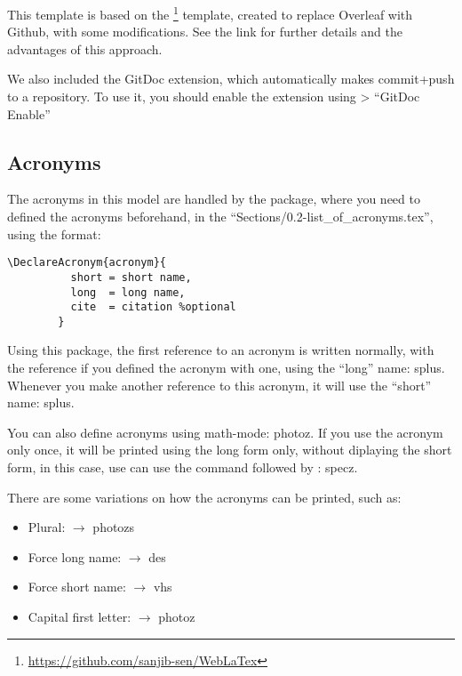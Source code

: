     This template is based on the \footnote{\url{https://github.com/sanjib-sen/WebLaTex}} template, created to replace Overleaf with Github, with some modifications. See the link for further details and the advantages of this approach.

    We also included the GitDoc extension, which automatically makes commit+push to a repository. To use it, you should enable the extension using  > ``GitDoc Enable''
  
    \subsection{Acronyms}
      The acronyms in this model are handled by the  package, where you need to defined the acronyms beforehand, in the ``Sections/0.2-list\_of\_acronyms.tex'', using the format:

      \begin{lstlisting}[autogobble]
        \DeclareAcronym{acronym}{
          short = short name,
          long  = long name,
          cite  = citation %optional
        }
    \end{lstlisting}

    Using this package, the first reference to an acronym is written normally, with the reference if you defined the acronym with one, using the ``long'' name: \ac{splus}. Whenever you make another reference to this acronym, it will use the ``short'' name: \ac{splus}.
    
    You can also define acronyms using math-mode: \ac{photoz}. If you use the acronym only once, it will be printed using the long form only, without diplaying the short form, in this case, use can use the  command followed by  : \ac{specz}.

    There are some variations on how the acronyms can be printed, such as:
    \begin{itemize}
      \item Plural:  $\rightarrow$ \acp{photoz}
      \item Force long name:  $\rightarrow$ \acl{des}
      \item Force short name:  $\rightarrow$ \acs{vhs}
      \item Capital first letter:  $\rightarrow$ \Ac{photoz}
    \end{itemize}


